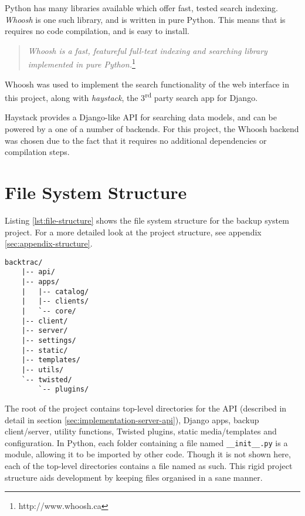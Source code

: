 Python has many libraries available which offer fast, tested search indexing.
\emph{Whoosh} is one such library, and is written in pure Python. This means
that is requires no code compilation, and is easy to install.

\begin{quote}
    \emph{Whoosh is a fast, featureful full-text indexing and searching library
    implemented in pure Python.}\footnote{http://www.whoosh.ca}
\end{quote}

Whoosh was used to implement the search functionality of the web interface in
this project, along with \emph{haystack}, the 3\textsuperscript{rd} party
search app for Django.

Haystack provides a Django-like API for searching data models, and can be
powered by a one of a number of backends. For this project, the Whoosh backend
was chosen due to the fact that it requires no additional dependencies or
compilation steps.

\section{File System Structure}
\label{sec:implementation-structure}

Listing \ref{lst:file-structure} shows the file system structure for the backup
system project. For a more detailed look at the project structure, see appendix
\ref{sec:appendix-structure}.

\noindent\begin{minipage}{\textwidth}
\begin{singlespacing}
\begin{lstlisting}[caption=Project file system structure,
    label=lst:file-structure]
    backtrac/
    |-- api/
    |-- apps/
    |   |-- catalog/
    |   |-- clients/
    |   `-- core/
    |-- client/
    |-- server/
    |-- settings/
    |-- static/
    |-- templates/
    |-- utils/
    `-- twisted/
        `-- plugins/
\end{lstlisting}
\end{singlespacing}
\end{minipage}

The root of the project contains top-level directories for the API (described
in detail in section \ref{sec:implementation-server-api}), Django apps, backup
client/server, utility functions, Twisted plugins, static media/templates and
configuration. In Python, each folder containing a file named
\verb!__init__.py! is a module, allowing it to be imported by other code.
Though it is not shown here, each of the top-level directories contains a file
named as such. This rigid project structure aids development by keeping files
organised in a sane manner.

